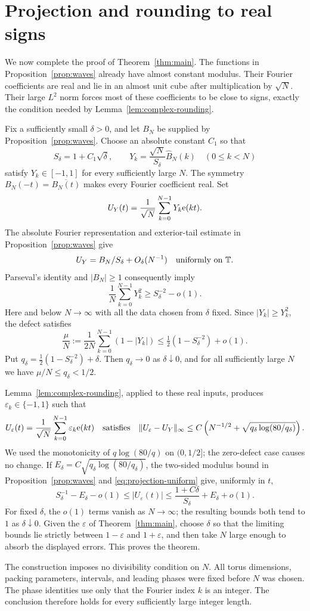 \section{Projection and rounding to real signs}\label{sec:completion}

We now complete the proof of Theorem~\ref{thm:main}. The functions in
Proposition~\ref{prop:waves} already have almost constant modulus.
Their Fourier coefficients are real and lie in an almost unit cube
after multiplication by $\sqrt N$. Their large $L^2$ norm forces
most of these coefficients to be close to signs, exactly the condition
needed by Lemma~\ref{lem:complex-rounding}.

Fix a sufficiently small $\delta>0$, and let $B_N$ be supplied by
Proposition~\ref{prop:waves}. Choose an absolute constant $C_1$ so that
\[
 S_\delta=1+C_1\sqrt\delta,
 \qquad Y_k=\frac{\sqrt N}{S_\delta}\widehat B_N(k)
 \quad(0\le k<N)
\]
satisfy $Y_k\in[-1,1]$ for every sufficiently large $N$.
The symmetry $B_N(-t)=\overline{B_N(t)}$ makes every Fourier
coefficient real. Set
\[
 U_Y(t)=\frac1{\sqrt N}\sum_{k=0}^{N-1}Y_k\mathrm e(kt).
\]
The absolute Fourier representation and exterior-tail estimate in
Proposition~\ref{prop:waves} give
\begin{equation}\label{eq:projection-uniform}
 U_Y=B_N/S_\delta+O_\delta(N^{-1})
 \quad\text{uniformly on }\mathbb T.
\end{equation}
Parseval's identity and $|B_N|\ge1$ consequently imply
\[
 \frac1N\sum_{k=0}^{N-1}Y_k^2\ge S_\delta^{-2}-o(1).
\]
Here and below $N\to\infty$ with all the data chosen from $\delta$
fixed. Since $|Y_k|\ge Y_k^2$, the defect satisfies
\[
 \frac\mu N:=\frac1{2N}\sum_{k=0}^{N-1}(1-|Y_k|)
 \le\tfrac12(1-S_\delta^{-2})+o(1).
\]
Put $q_\delta=\tfrac12(1-S_\delta^{-2})+\delta$.
Then $q_\delta\to0$ as $\delta\downarrow0$, and for all sufficiently
large $N$ we have $\mu/N\le q_\delta<1/2$.

Lemma~\ref{lem:complex-rounding}, applied to these real inputs, produces
$\varepsilon_k\in\{-1,1\}$ such that
\[
 U_\varepsilon(t)=\frac1{\sqrt N}\sum_{k=0}^{N-1}\varepsilon_k\mathrm e(kt)
 \quad\text{satisfies}\quad
 \lVert U_\varepsilon-U_Y\rVert_\infty
 \le C\left(N^{-1/2}+
        \sqrt{q_\delta\log(80/q_\delta)}\right).
\]
We used the monotonicity of $q\log(80/q)$ on $(0,1/2]$;
the zero-defect case causes no change. If
$E_\delta=C\sqrt{q_\delta\log(80/q_\delta)}$, the two-sided modulus
bound in Proposition~\ref{prop:waves} and
\eqref{eq:projection-uniform} give, uniformly in $t$,
\[
 S_\delta^{-1}-E_\delta-o(1)
 \le |U_\varepsilon(t)|
 \le \frac{1+C\delta}{S_\delta}+E_\delta+o(1).
\]
For fixed $\delta$, the $o(1)$ terms vanish as $N\to\infty$;
the resulting bounds both tend to $1$ as $\delta\downarrow0$.
Given the $\varepsilon$ of Theorem~\ref{thm:main},
choose $\delta$ so that the limiting bounds lie strictly between
$1-\varepsilon$ and $1+\varepsilon$, and then take $N$ large enough
to absorb the displayed errors. This proves the theorem.

The construction imposes no divisibility condition on $N$.
All torus dimensions, packing parameters, intervals, and leading phases were
fixed before $N$ was chosen. The phase identities use only that the
Fourier index $k$ is an integer. The conclusion therefore holds for
every sufficiently large integer length.
